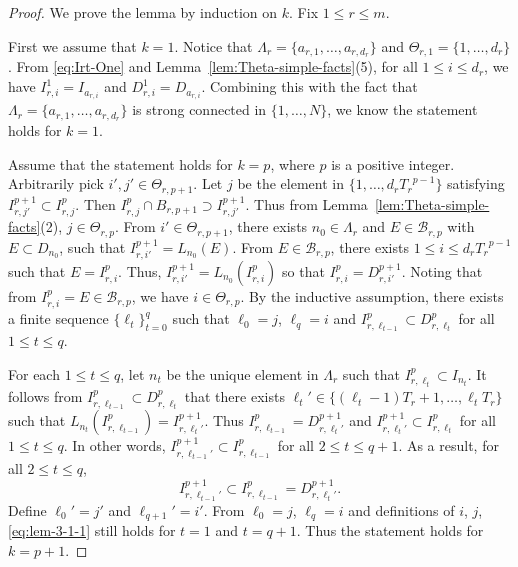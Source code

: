 \documentclass[11pt]{amsart}
\theoremstyle{definition}
\theoremstyle{remark}
\numberwithin{equation}{section}
\newcommand{\mB}{{\mathcal B}}
\begin{document}
 
 \begin{proof}
 	We prove the lemma by induction on $k$. Fix $1\leq r\leq m$. 
 	
 	First we assume that $k=1$. Notice that $\Lambda_r=\{a_{r,1}, \ldots,a_{r,d_r}\}$ 
 	and $\Theta_{r,1}=\{1,\ldots,d_r\}$. From \eqref{eq:Irt-One} and Lemma~\ref{lem:Theta-simple-facts}(5), for all $1\leq i\leq d_r$, we have $I_{r,i}^1=I_{a_{r,i}}$ and $D_{r,i}^1=D_{a_{r,i}}$. Combining this with the fact that $\Lambda_r=\{a_{r,1}, \ldots, a_{r,d_r}\}$ is strong connected in $\{1,\ldots,N\}$, we know the statement holds for $k=1$.
 	
 	Assume that the statement holds for $k=p$, where $p$ is a positive integer. Arbitrarily pick $i',j'\in \Theta_{r,p+1}$. Let $j$ be the element in $\{1,\ldots,d_r {T_r}^{p-1}\}$ satisfying $I_{r,j'}^{p+1} \subset I_{r,j}^p$. Then $I_{r,j}^p\cap B_{r,p+1}\supset I_{r,j'}^{p+1}$. Thus from Lemma~\ref{lem:Theta-simple-facts}(2), $j \in \Theta_{r,p}$.
 	From $i'\in \Theta_{r,p+1}$, there exists $n_0\in \Lambda_r$ and $E\in \mB_{r,p}$ with $E\subset D_{n_0}$, such that $I_{r,i'}^{p+1}=L_{n_0}(E)$. From $E\in \mB_{r,p}$, there exists $1\leq i\leq d_r {T_r}^{p-1}$ such that $E=I_{r,i}^p$. Thus, $I_{r,i'}^{p+1}=L_{n_0}(I_{r,i}^p)$ so that
 	$I_{r,i}^p=D_{r,i'}^{p+1}$. Noting that from $I_{r,i}^p=E\in \mB_{r,p}$, we have $i\in \Theta_{r,p}$. 	
 	By the inductive assumption, there exists a finite sequence $\{\ell_t\}_{t=0}^{q}$ such that
 	$\ell_0=j$, $\ell_{q}=i$ and $I_{r,\ell_{t-1}}^p \subset D_{r,\ell_t}^p$ for all $1\leq t\leq q$.
 	
 	For each $1\leq t\leq q$, let $n_t$ be the unique element in $\Lambda_r$ such that $I_{r,\ell_t}^p\subset I_{n_t}$. It follows from $I_{r,\ell_{t-1}}^p\subset D_{r,\ell_t}^p$ that there exists $\ell_t'\in\{(\ell_t-1)T_r+1,\ldots,\ell_t T_r\}$ such that $L_{n_t}(I_{r,\ell_{t-1}}^p)=I_{r,\ell_t'}^{p+1}$. 
	 Thus $I_{r,\ell_{t-1}}^p=D_{r,\ell_t'}^{p+1}$ and $I_{r,\ell_t'}^{p+1}\subset I_{r,\ell_t}^p$ for all $1\leq t\leq q$. In other words, $I_{r,\ell_{t-1}'}^{p+1}\subset I_{r,\ell_{t-1}}^p$ for all $2\leq t\leq q+1$. 
 	As a result, for all $2\leq t\leq q$,
 	\begin{equation}\label{eq:lem-3-1-1}
 		I_{r,\ell_{t-1}'}^{p+1} \subset I_{r,\ell_{t-1}}^p=D_{r,\ell_t'}^{p+1}.
 	\end{equation}	
 	Define $\ell_0'=j'$ and $\ell_{q+1}'=i'$. From $\ell_0=j$, $\ell_q=i$ and definitions of $i$, $j$, \eqref{eq:lem-3-1-1} still holds for $t=1$ and $t=q+1$. Thus the statement holds for $k=p+1$. 	
 \end{proof}
\end{document}
